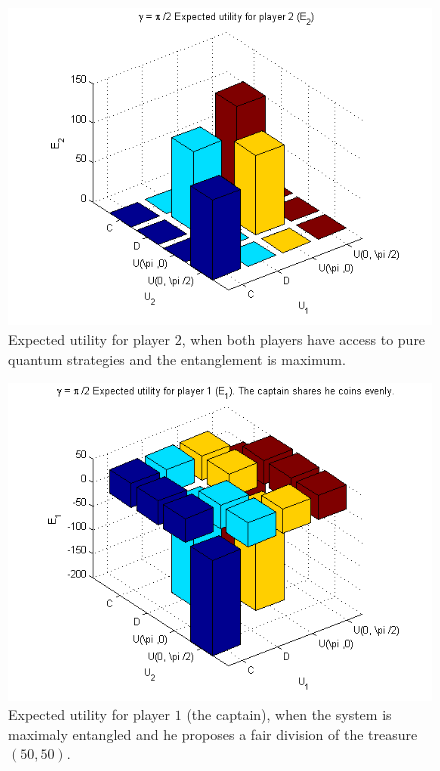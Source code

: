\documentclass[10pt,twocolumn]{llncs}
\begin{document}
\begin{figure}[h!]
\centering 
\includegraphics[scale=0.60]{Figures/1.5qubit/P2_E2.png}
\caption{Expected utility for player $2$, when both players have access to pure quantum strategies and the entanglement is maximum. }
\label{fig:pg_2players_99_0_1:2}
\end{figure}



\begin{figure}[h!]
\centering 
\includegraphics[scale=0.60]{Figures/1.5qubit/poorcaptain.png}
\caption{Expected utility for player $1$ (the captain), when the system is maximaly entangled and he proposes a fair division of the treasure $(50,50)$.}
\label{fig:pg_2players_99_0_1:33}
\end{figure}
\end{document}
